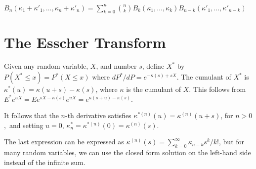 \documentclass[fleqn]{amsart}
\theoremstyle{definition}
\begin{document}
\(B_n(\kappa_1 + \kappa'_1, \ldots, \kappa_n + \kappa'_n) = \sum_{k=0}^n\binom{n}{k}B_k(\kappa_1,\ldots,\kappa_k) B_{n-k}(\kappa'_1,\ldots,\kappa'_{n-k})\) 
\section{The Esscher Transform}

Given any random variable, \(X\), and number \(s\), define
\(X^*\) by \(P(X^*\le x) = P^*(X\le x)\) where
\(dP^*/dP = e^{-\kappa(s) + sX}\).
The cumulant of \(X^*\) is \(\kappa^*(u) = \kappa(u + s) - \kappa(s)\),
where \(\kappa\) is the cumulant of \(X\).
This follows from \(E^* e^{uX} = Ee^{sX - \kappa(s)} e^{uX}
= e^{\kappa(s + u) - \kappa(s)}\).

It follows that the \(n\)-th derivative satisfies
\(\kappa^{*(n)}(u) = \kappa^{(n)}(u + s)\), for \(n > 0\),\
and setting $u=0$, \(\kappa^*_n = \kappa^{*(n)}(0) = \kappa^{(n)}(s)\).

The last expression can be expressed as \(\kappa^{(n)}(s) =
\sum_{k=0}^\infty \kappa_{n - k} s^k/k!\), but for many random variables,
we can use the closed form solution on the left-hand side instead of
the infinite sum.

%
%
\end{document}
